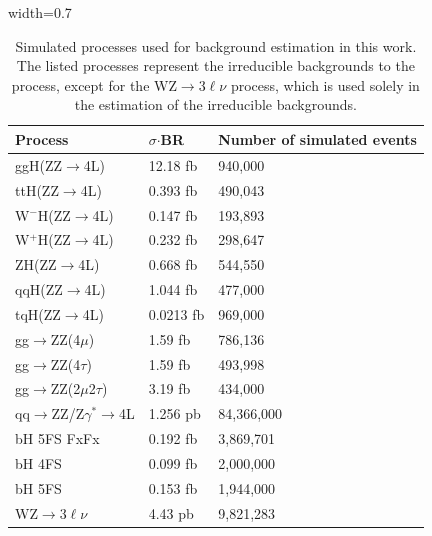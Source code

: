 \begin{table}[H]
    \centering
    \caption[]{Simulated processes used for background estimation in this work. The listed processes represent the irreducible backgrounds to the \cHZZ process, except for the WZ$\rightarrow3\ell\nu$ process, which is used solely in the estimation of the irreducible backgrounds.}
    \begin{adjustbox}{width=0.7\textwidth}
    \label{table:IrreducibleBackgroundSamples}
        \begin{tabular}{l l l}
        \toprule 
        \textbf{Process} & \textbf{$\sigma$}$\cdot$BR & \textbf{Number of simulated events}\\
        \midrule 
        \midrule
        ggH(ZZ$\rightarrow$4L) & 12.18 fb & 940,000 \\
        ttH(ZZ$\rightarrow$4L) & 0.393 fb & 490,043 \\ 
        W$^{-}$H(ZZ$\rightarrow$4L) & 0.147 fb & 193,893 \\
        W$^{+}$H(ZZ$\rightarrow$4L) & 0.232 fb & 298,647 \\
        ZH(ZZ$\rightarrow$4L) & 0.668 fb & 544,550 \\
        qqH(ZZ$\rightarrow$4L) & 1.044 fb & 477,000 \\
        tqH(ZZ$\rightarrow$4L) & 0.0213 fb & 969,000 \\
        gg$\rightarrow$ZZ(4$\mu$) & 1.59 fb & 786,136 \\
        gg$\rightarrow$ZZ(4$\tau$) & 1.59 fb & 493,998 \\
        gg$\rightarrow$ZZ(2$\mu$2$\tau$) & 3.19 fb & 434,000 \\
        qq$\rightarrow$ZZ/Z$\gamma^*\rightarrow$4L & 1.256 pb & 84,366,000 \\ 
        \midrule 
        bH 5FS FxFx & 0.192 fb & 3,869,701 \\
        bH 4FS &  0.099 fb & 2,000,000 \\
        bH 5FS & 0.153 fb & 1,944,000 \\
        \midrule
        WZ$\rightarrow3\ell\nu$ & 4.43 pb & 9,821,283 \\
        \bottomrule
        \end{tabular} 
    \end{adjustbox}
\end{table}

